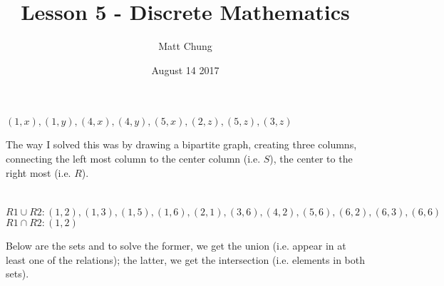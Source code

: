 \documentclass{article}
\title{Lesson 5 - Discrete Mathematics}
\author{Matt Chung}
\date{August 14 2017}
\begin{document}
\maketitle

\section{}

\begin{center}
\end{center}

\section{}

${(1,x), (1,y), (4,x), (4,y), (5,x), (2,z), (5,z), (3,z)}$

The way I solved this was by drawing a bipartite graph, creating three columns, connecting the left most column to the center column (i.e. $S$), the center to the right most (i.e. $R$). 

\section{}

$R1 \cup R2: (1,2), (1,3), (1,5), (1,6), (2,1), (3,6), (4,2), (5,6), (6,2), (6,3), (6,6)$\\
$R1 \cap R2: (1,2)$

Below are the sets and to solve the former, we get the union (i.e. appear in at least one of the relations); the latter, we get the intersection (i.e. elements in both sets).
\end{document}
